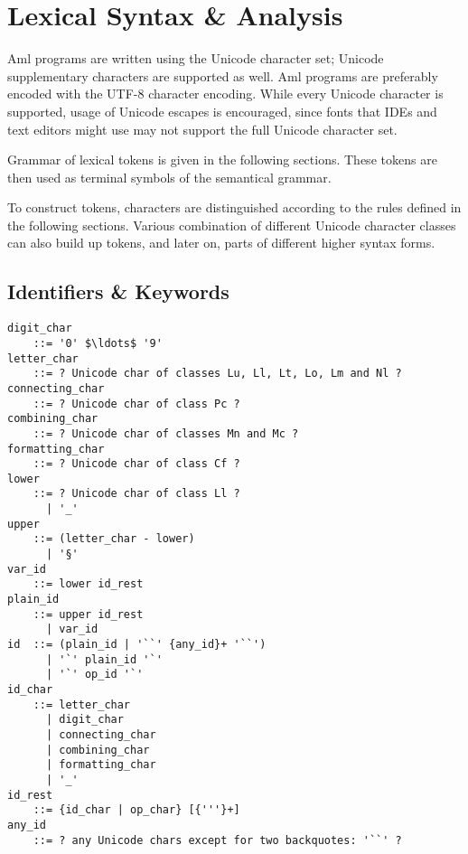 
\newcommand{\Unicode}[1]{\mbox{$\backslash$u{#1}}}
\newcommand{\UnicodeRange}[2]{\mbox{$\backslash$u{#1}-$\backslash$u{#2}}}

\chapter{Lexical Syntax \& Analysis}
\label{sec:lexical-analysis}

\minitoc

Aml programs are written using the Unicode character set; Unicode supplementary characters are supported as well. Aml programs are preferably encoded with the UTF-8 character encoding. While every Unicode character is supported, usage of Unicode escapes is encouraged, since fonts that IDEs and text editors might use may not support the full Unicode character set.

Grammar of lexical tokens is given in the following sections. These tokens are then used as terminal symbols of the semantical grammar. 

To construct tokens, characters are distinguished according to the rules defined in the following sections. Various combination of different Unicode character classes can also build up tokens, and later on, parts of different higher syntax forms. 


\newpage






\section{Identifiers \& Keywords}
\label{sec:identifiers}
\label{sec:keywords}

\syntax\begin{lstlisting}[deletekeywords={of,and,class,for}]
digit_char 
    ::= '0' $\ldots$ '9'
letter_char
    ::= ? Unicode char of classes Lu, Ll, Lt, Lo, Lm and Nl ?
connecting_char 
    ::= ? Unicode char of class Pc ?
combining_char
    ::= ? Unicode char of classes Mn and Mc ?
formatting_char 
    ::= ? Unicode char of class Cf ?
lower 
    ::= ? Unicode char of class Ll ? 
      | '_'
upper 
    ::= (letter_char - lower) 
      | '§'
var_id 
    ::= lower id_rest
plain_id 
    ::= upper id_rest
      | var_id
id  ::= (plain_id | '``' {any_id}+ '``')
      | '`' plain_id '`'
      | '`' op_id '`'
id_char 
    ::= letter_char
      | digit_char
      | connecting_char
      | combining_char
      | formatting_char
      | '_'
id_rest 
    ::= {id_char | op_char} [{'''}+]
any_id 
    ::= ? any Unicode chars except for two backquotes: '``' ?
\end{lstlisting}

